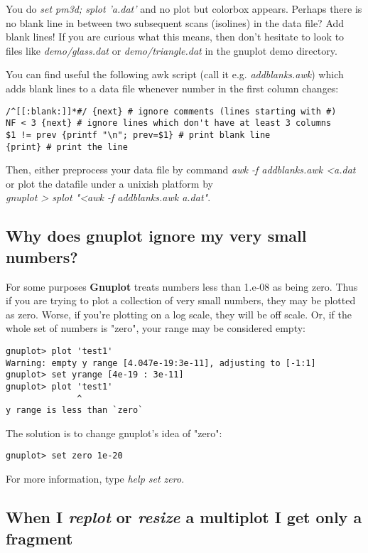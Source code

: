 \documentclass[letter,11pt]{article}
\newcommand{\gnuplot}{\textbf{gnuplot }}
\newcommand{\Gnuplot}{\textbf{Gnuplot }}
\begin{document}
{You do {\em set pm3d; splot 'a.dat'} and no plot but colorbox appears.
Perhaps there is no blank line in between two subsequent scans (isolines) in
the data file? Add blank lines! If you are curious what this means, then don't
hesitate to look to files like {\em demo/glass.dat} or {\em demo/triangle.dat}
in the gnuplot demo directory.

You can find useful the following awk script (call it e.g. {\em addblanks.awk})
which adds blank lines to a data file whenever number in the first column
changes:
\small
\begin{verbatim}
/^[[:blank:]]*#/ {next} # ignore comments (lines starting with #)
NF < 3 {next} # ignore lines which don't have at least 3 columns
$1 != prev {printf "\n"; prev=$1} # print blank line
{print} # print the line
\end{verbatim}
\normalsize

Then, either preprocess your data file by command
{\em awk -f addblanks.awk <a.dat}
or plot the datafile under a unixish platform by\\
{\em gnuplot > splot "<awk -f addblanks.awk a.dat"}.

\subsection{Why does \gnuplot ignore my very small numbers?}

For some purposes \Gnuplot{} treats numbers less than 1.e-08 as being zero.
Thus if you are trying to plot a collection of very small numbers,
they may be plotted as zero. Worse, if you're plotting
on a log scale, they will be off scale. Or, if the whole set of
numbers is "zero", your range may be considered empty:

\small
\begin{verbatim}
gnuplot> plot 'test1'
Warning: empty y range [4.047e-19:3e-11], adjusting to [-1:1]
gnuplot> set yrange [4e-19 : 3e-11]
gnuplot> plot 'test1'
              ^
y range is less than `zero`
\end{verbatim}
\normalsize

The solution is to change gnuplot's idea of "zero":
\small
\begin{verbatim}
gnuplot> set zero 1e-20
\end{verbatim}
\normalsize

For more information, type {\em help set zero}.

\subsection{When I {\em replot} or {\em resize} a multiplot I get only a fragment}

}
\end{document}
